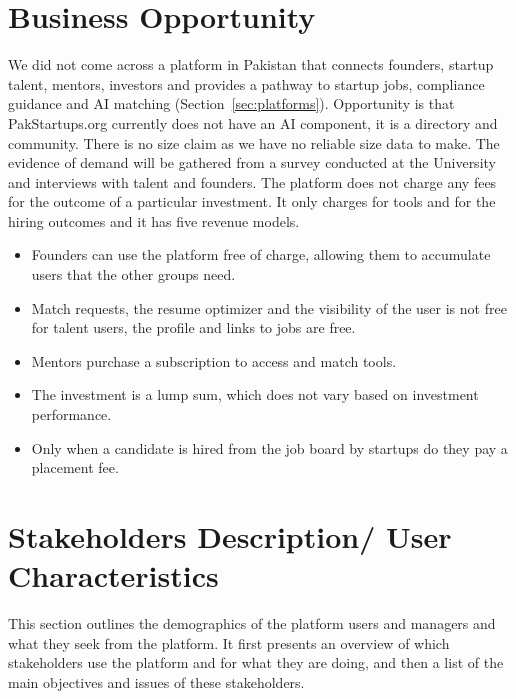 \documentclass{FastFyp}
\begin{document}
\section{Business Opportunity}
We did not come across a platform in Pakistan that connects founders, startup talent, mentors, investors and provides a pathway to startup jobs, compliance guidance and AI matching (Section~\ref{sec:platforms}). Opportunity is that PakStartups.org currently does not have an AI component, it is a directory and community. There is no size claim as we have no reliable size data to make. The evidence of demand will be gathered from a survey conducted at the University and interviews with talent and founders. The platform does not charge any fees for the outcome of a particular investment. It only charges for tools and for the hiring outcomes and it has five revenue models.
\begin{itemize}
\item Founders can use the platform free of charge, allowing them to accumulate users that the other groups need.
\item Match requests, the resume optimizer and the visibility of the user is not free for talent users, the profile and links to jobs are free.
\item Mentors purchase a subscription to access and match tools.
\item The investment is a lump sum, which does not vary based on investment performance.
\item Only when a candidate is hired from the job board by startups do they pay a placement fee.
\end{itemize}

\section{Stakeholders Description/ User Characteristics}
This section outlines the demographics of the platform users and managers and what they seek from the platform. It first presents an overview of which stakeholders use the platform and for what they are doing, and then a list of the main objectives and issues of these stakeholders.
\end{document}
